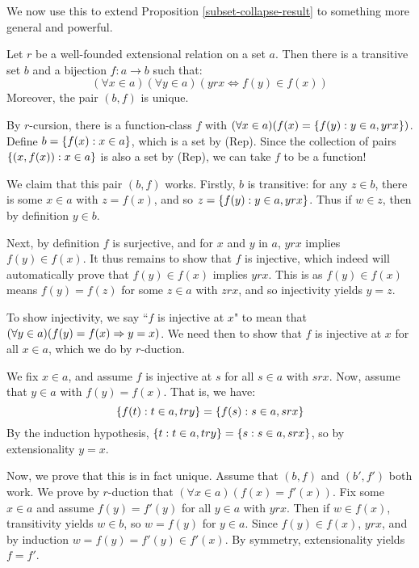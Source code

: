 \documentclass{article}
\begin{document}
We now use this to extend Proposition \ref{subset-collapse-result} to something more general and powerful.

\begin{theorem}
	\label{mostowkis-collapsing-theorem}
    Let $r$ be a well-founded extensional relation on a set $a$. Then there is a transitive set $b$ and a bijection $f : a \to b$ such that:
    \[
	(\forall x \in a)(\forall y \in a)
	(yrx \Leftrightarrow f(y) \in f(x))
	\]
	Moreover, the pair $(b, f)$ is unique.
\end{theorem}

\begin{prf}
    By $r$-cursion, there is a function-class $f$ with $(\forall x \in a)(f(x) = \left\lbrace f(y) : y \in a, yrx \right\rbrace)$. Define $b = \left\lbrace f(x) : x \in a \right\rbrace$, which is a set by (Rep).
    Since the collection of pairs $\left\lbrace (x, f(x)) : x \in a \right\rbrace$ is also a set by (Rep), we can take $f$ to be a function!
    
    We claim that this pair $(b, f)$ works. Firstly, $b$ is transitive: for any $z \in b$, there is some $x \in a$ with $z = f(x)$, and so $z = \left\lbrace f(y) : y \in a, yrx \right\rbrace$. Thus if $w \in z$, then by definition $y \in b$.
    
    Next, by definition $f$ is surjective, and for $x$ and $y$ in $a$, $yrx$ implies $f(y) \in f(x)$. It thus remains to show that $f$ is injective, which indeed will automatically prove that $f(y) \in f(x)$ implies $yrx$. This is as $f(y) \in f(x)$ means $f(y) = f(z)$ for some $z \in a$ with $zrx$, and so injectivity yields $y = z$.
    
    To show injectivity, we say ``$f$ is injective at $x$" to mean that $(\forall y \in a)(f(y) = f(x) \Rightarrow y = x)$. We need then to show that $f$ is injective at $x$ for all $x \in a$, which we do by $r$-duction.
    
    We fix $x \in a$, and assume $f$ is injective at $s$ for all $s \in a$ with $srx$. Now, assume that $y \in a$ with $f(y) = f(x)$. That is, we have:
    \[
	\left\lbrace f(t) : t \in a, try \right\rbrace = \left\lbrace f(s) : s \in a, srx \right\rbrace
	\]
	By the induction hypothesis, $\left\lbrace t : t \in a, try \right\rbrace = \left\lbrace s : s \in a, srx \right\rbrace$, so by extensionality $y=x$.
	
	Now, we prove that this is in fact unique. Assume that $(b, f)$ and $(b', f')$ both work. We prove by $r$-duction that $(\forall x \in a)(f(x) = f'(x))$.
	Fix some $x \in a$ and assume $f(y) = f'(y)$ for all $y \in a$ with $yrx$. Then if $w \in f(x)$, transitivity yields $w \in b$, so $w = f(y)$ for $y \in a$. Since $f(y) \in f(x)$, $yrx$, and by induction $w = f(y) = f'(y) \in f'(x)$. By symmetry, extensionality yields $f = f'$.
\end{prf}
\end{document}
